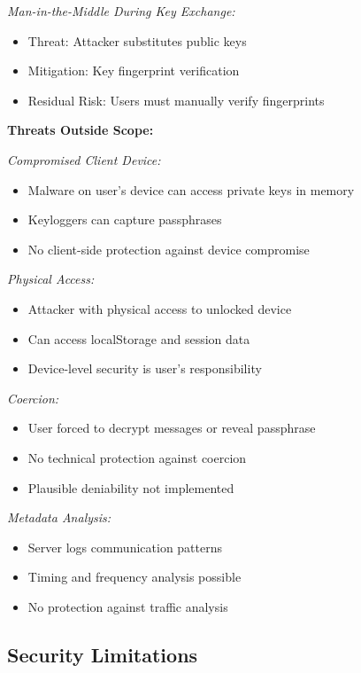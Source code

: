 \textit{Man-in-the-Middle During Key Exchange:}
\begin{itemize}
    \item Threat: Attacker substitutes public keys
    \item Mitigation: Key fingerprint verification
    \item Residual Risk: Users must manually verify fingerprints
\end{itemize}

\textbf{Threats Outside Scope:}

\textit{Compromised Client Device:}
\begin{itemize}
    \item Malware on user's device can access private keys in memory
    \item Keyloggers can capture passphrases
    \item No client-side protection against device compromise
\end{itemize}

\textit{Physical Access:}
\begin{itemize}
    \item Attacker with physical access to unlocked device
    \item Can access localStorage and session data
    \item Device-level security is user's responsibility
\end{itemize}

\textit{Coercion:}
\begin{itemize}
    \item User forced to decrypt messages or reveal passphrase
    \item No technical protection against coercion
    \item Plausible deniability not implemented
\end{itemize}

\textit{Metadata Analysis:}
\begin{itemize}
    \item Server logs communication patterns
    \item Timing and frequency analysis possible
    \item No protection against traffic analysis
\end{itemize}

\subsection{Security Limitations}

